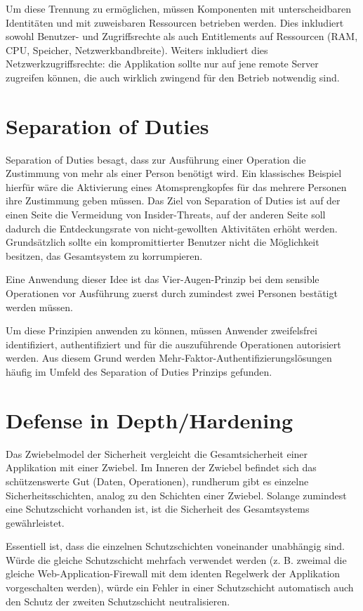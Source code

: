 Um diese Trennung zu ermöglichen, müssen Komponenten mit unterscheidbaren Identitäten und mit zuweisbaren Ressourcen betrieben werden. Dies inkludiert sowohl Benutzer- und Zugriffsrechte als auch Entitlements auf Ressourcen (RAM, CPU, Speicher, Netzwerkbandbreite). Weiters inkludiert dies Netzwerkzugriffsrechte: die Applikation sollte nur auf jene remote Server zugreifen können, die auch wirklich zwingend für den Betrieb notwendig sind.

\section{Separation of Duties}

Separation of Duties besagt, dass zur Ausführung einer Operation die Zustimmung von mehr als einer Person benötigt wird. Ein klassisches Beispiel hierfür wäre die Aktivierung eines Atomsprengkopfes für das mehrere Personen ihre Zustimmung geben müssen. Das Ziel von Separation of Duties ist auf der einen Seite die Vermeidung von Insider-Threats, auf der anderen Seite soll dadurch die Entdeckungsrate von nicht-gewollten Aktivitäten erhöht werden. Grundsätzlich sollte ein kompromittierter Benutzer nicht die Möglichkeit besitzen, das Gesamtsystem zu korrumpieren.

Eine Anwendung dieser Idee ist das Vier-Augen-Prinzip bei dem sensible Operationen vor Ausführung zuerst durch zumindest zwei Personen bestätigt werden müssen.

Um diese Prinzipien anwenden zu können, müssen Anwender zweifelsfrei identifiziert, authentifiziert und für die auszuführende Operationen autorisiert werden. Aus diesem Grund werden Mehr-Faktor-Authentifizierungslösungen häufig im Umfeld des Separation of Duties Prinzips gefunden.

\section{Defense in Depth/Hardening}

Das Zwiebelmodel der Sicherheit vergleicht die Gesamtsicherheit einer Applikation mit einer Zwiebel. Im Inneren der Zwiebel befindet sich das schützenswerte Gut (Daten, Operationen), rundherum gibt es einzelne Sicherheitsschichten, analog zu den Schichten einer Zwiebel. Solange zumindest eine Schutzschicht vorhanden ist, ist die Sicherheit des Gesamtsystems gewährleistet.

Essentiell ist, dass die einzelnen Schutzschichten voneinander unabhängig sind. Würde die gleiche Schutzschicht mehrfach verwendet werden (z. B. zweimal die gleiche Web-Application-Firewall mit dem identen Regelwerk der Applikation vorgeschalten werden), würde ein Fehler in einer Schutzschicht automatisch auch den Schutz der zweiten Schutzschicht neutralisieren.

